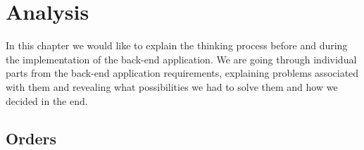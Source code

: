 \chapter{Analysis}
In this chapter we would like to explain the thinking process before and during the implementation of the back-end application. We are going through individual parts from the back-end application requirements, explaining problems associated with them and revealing what possibilities we had to solve them and how we decided in the end.
\section{Orders}
